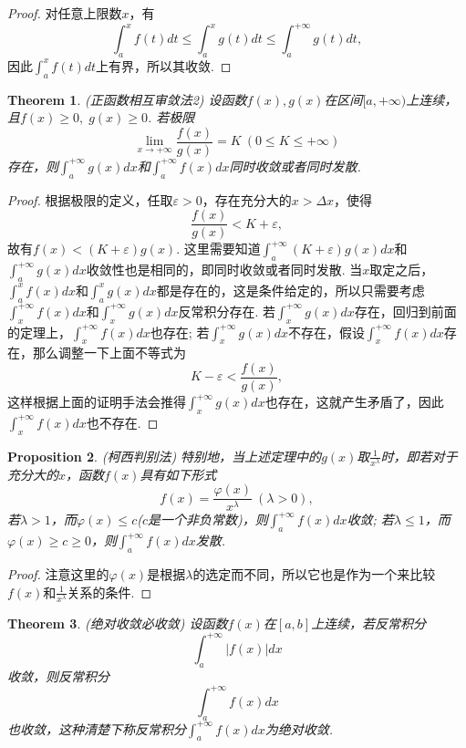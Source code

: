 \documentclass{article}
\newtheorem{theorem}{Theorem}[section]
\newtheorem{proposition}[theorem]{Proposition}
\begin{document}
\begin{proof}
对任意上限数$x$，有
$$
\int_a^x f(t)dt \leq \int_a^x g(t)dt \leq \int_a^{+\infty} g(t)dt,
$$
因此$\int_a^x f(t)dt$上有界，所以其收敛.
\end{proof}

\begin{theorem}
\rm \rm {\color{red} (正函数相互审敛法2)} 设函数$f(x),g(x)$在区间$[a,+\infty)$上连续，且$f(x)\geq 0,\; g(x) \geq 0$. 若极限
$$
\lim\limits_{x \rightarrow + \infty} \frac{f(x)}{g(x)} = K~(0 \leq K \leq +\infty)
$$
存在，则$\int_a^{+\infty} g(x)dx$和$\int_a^{+\infty} f(x)dx$同时收敛或者同时发散. 
\end{theorem}

\begin{proof}
根据极限的定义，任取$\varepsilon > 0$，存在充分大的$x > \Delta x$，使得
$$
\frac{f(x)}{g(x)} < K + \varepsilon,
$$
故有$f(x) <  (K+\varepsilon)g(x)$. 这里需要知道$\int_a^{+\infty}(K+\varepsilon)g(x)dx$和$\int_a^{+\infty}g(x)dx$收敛性也是相同的，即同时收敛或者同时发散. 当$x$取定之后，$\int_a^{x} f(x)dx$和$\int_a^{x} g(x)dx$都是存在的，这是条件给定的，所以只需要考虑$\int_{x}^{+\infty}f(x)dx$和$\int_{x}^{+\infty}g(x)dx$反常积分存在. 若$\int_{x}^{+\infty}g(x)dx$存在，回归到前面的定理上，$\int_{x}^{+\infty}f(x)dx$也存在; 若$\int_{x}^{+\infty}g(x)dx$不存在，假设$\int_{x}^{+\infty}f(x)dx$存在，那么调整一下上面不等式为
$$
K-\varepsilon < \frac{f(x)}{g(x)},
$$
这样根据上面的证明手法会推得$\int_{x}^{+\infty}g(x)dx$也存在，这就产生矛盾了，因此$\int_{x}^{+\infty}f(x)dx$也不存在. 
\end{proof}

\begin{proposition}
\rm {\color{red} (柯西判别法)} 特别地，当上述定理中的$g(x)$取$\frac{1}{x^\lambda}$时，即若对于充分大的$x$，函数$f(x)$具有如下形式
$$
f(x) = \frac{\varphi(x)}{x^\lambda}~(\lambda > 0),
$$
若$\lambda > 1$，而$\varphi(x) \leq c$($c$是一个非负常数)，则$\int_a^{+\infty}f(x)dx$收敛; 若$\lambda \leq 1$，而$\varphi(x) \geq c \geq 0$，则$\int_a^{+\infty}f(x)dx$发散.
\end{proposition}

\begin{proof}
{\color{blue}注意这里的$\varphi(x)$是根据$\lambda$的选定而不同}，所以它也是作为一个来比较$f(x)$和$\frac{1}{x^\lambda}$关系的条件. 
\end{proof}

\begin{theorem}
\rm {\color{red} (绝对收敛必收敛)} 设函数$f(x)$在$[a,b]$上连续，若反常积分
$$
\int_a^{+\infty} |f(x)|dx
$$
收敛，则反常积分
$$
\int_a^{+\infty} f(x)dx
$$
也收敛，这种清楚下称反常积分$\int_a^{+\infty} f(x)dx$为{\color{red}绝对收敛}.
\end{theorem}
\end{document}
